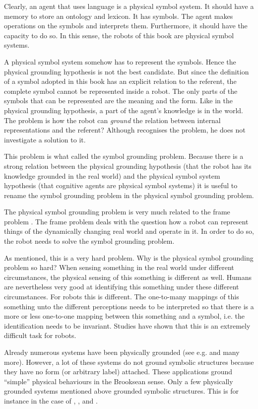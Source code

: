 Clearly, an agent that uses language is a physical symbol system. It should have a memory to store an ontology and lexicon. It has symbols. The agent makes operations on the symbols and interprets them. Furthermore, it should have the capacity to do so. In this sense, the robots of this book are physical symbol systems.

A physical symbol system somehow has to represent the symbols. Hence the physical grounding hypothesis is not the best candidate. But since the definition of a symbol adopted in this book has an explicit relation to the referent, the complete symbol cannot be represented inside a robot. The only parts of the symbols that can be represented are the meaning and the form. Like in the physical grounding hypothesis, a part of the agent's knowledge is in the world. The problem is how the robot can {\em ground} the relation between internal representations and the referent? Although \citet{newell:1990} recognises the problem, he does not investigate a solution to it.

This problem is what \citet{harnad:1990} called the symbol grounding problem. Because there is a strong relation between the physical grounding hypothesis (that the robot has its knowledge grounded in the real world) and the physical symbol system hypothesis (that cognitive agents are physical symbol systems) it is useful to rename the symbol grounding problem in the {\sc physical symbol grounding problem}.

The physical symbol grounding problem is very much related to the {\sc frame problem} \citep{pylyshyn:1987}. The frame problem deals with the question how a robot can represent things of the dynamically changing real world and operate in it. In order to do so, the robot needs to solve the symbol grounding problem. 


As mentioned, this is a very hard problem. Why is the physical symbol grounding problem so hard? When sensing something in the real world under different circumstances, the physical sensing of this something is different as well. Humans are nevertheless very good at identifying this something under these different circumstances. For robots this is different. The one-to-many mappings of this something unto the different perceptions needs to be interpreted so that there is a more or less one-to-one mapping between this something and a symbol, i.e. the identification needs to be invariant. Studies have shown that this is an extremely difficult task for robots.

Already numerous systems have been physically grounded (see e.g. \citealt{brooks:1990,steels:1994,barnesetal:1997,KroBunVlaMot99,taninolfi:1998,berthouzekuniyoshi:1998,pfeiferscheier:1999,billard:1997a,rosenstein:1998a,yancostein} and many more). However, a lot of these systems do not ground symbolic structures because they have no form (or arbitrary label) attached. These applications ground ``simple'' physical behaviours in the Brooksean sense. Only a few physically grounded systems mentioned above grounded symbolic structures. This is for instance in the case of \citet{yancostein}, \citet{billard:1997a}, and \citet{rosenstein:1998a}. 


